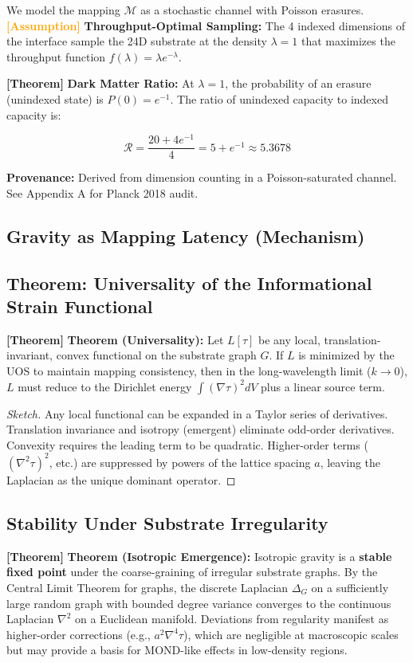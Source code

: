 \documentclass[11pt,titlepage]{article}
\newcommand{\tagass}{\textcolor{orange}{\textbf{[Assumption]}} }
\newcommand{\tagtheo}{\textcolor{green!60!black}{\textbf{[Theorem]}} }
\begin{document}
We model the mapping $\mathcal{M}$ as a stochastic channel with Poisson erasures.
\tagass \textbf{Throughput-Optimal Sampling:} The 4 indexed dimensions of the interface sample the 24D substrate at the density $\lambda=1$ that maximizes the throughput function $f(\lambda) = \lambda e^{-\lambda}$.

\tagtheo \textbf{Dark Matter Ratio:} At $\lambda=1$, the probability of an erasure (unindexed state) is $P(0) = e^{-1}$. The ratio of unindexed capacity to indexed capacity is:

\begin{equation}
\mathcal{R} = \frac{20 + 4e^{-1}}{4} = 5 + e^{-1} \approx 5.3678
\end{equation}

\textbf{Provenance:} Derived from dimension counting in a Poisson-saturated channel. See Appendix A for Planck 2018 audit.

\subsection{Gravity as Mapping Latency (Mechanism)}


\subsection{Theorem: Universality of the Informational Strain Functional}
\tagtheo \textbf{Theorem (Universality):} Let $L[\tau]$ be any local, translation-invariant, convex functional on the substrate graph $G$. If $L$ is minimized by the UOS to maintain mapping consistency, then in the long-wavelength limit ($k \to 0$), $L$ must reduce to the Dirichlet energy $\int (\nabla \tau)^2 dV$ plus a linear source term.
\begin{proof}[Sketch]
Any local functional can be expanded in a Taylor series of derivatives. Translation invariance and isotropy (emergent) eliminate odd-order derivatives. Convexity requires the leading term to be quadratic. Higher-order terms ($(\nabla^2 \tau)^2$, etc.) are suppressed by powers of the lattice spacing $a$, leaving the Laplacian as the unique dominant operator.
\end{proof}

\subsection{Stability Under Substrate Irregularity}
\tagtheo \textbf{Theorem (Isotropic Emergence):} Isotropic gravity is a \textbf{stable fixed point} under the coarse-graining of irregular substrate graphs. By the Central Limit Theorem for graphs, the discrete Laplacian $\Delta_G$ on a sufficiently large random graph with bounded degree variance converges to the continuous Laplacian $\nabla^2$ on a Euclidean manifold. Deviations from regularity manifest as higher-order corrections (e.g., $a^2 \nabla^4 \tau$), which are negligible at macroscopic scales but may provide a basis for MOND-like effects in low-density regions.
\end{document}
